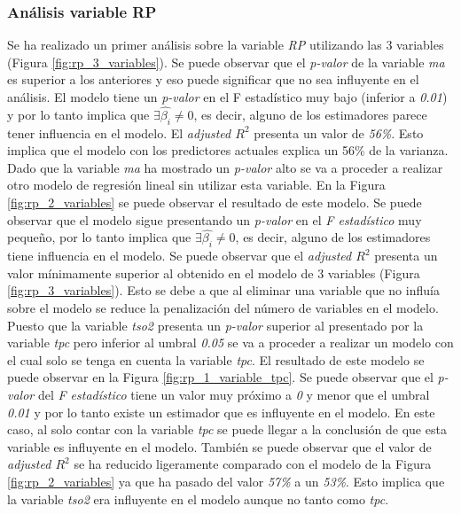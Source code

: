 \documentclass{article}
\begin{document}
\subsubsection{Análisis variable RP}

Se ha realizado un primer análisis sobre la variable \textit{RP} utilizando las 3 variables (Figura \ref{fig:rp_3_variables}). Se puede observar que el \textit{p-valor} de la variable \textit{ma} es superior a los anteriores y eso puede significar que no sea influyente en el análisis. El modelo tiene un \textit{p-valor} en el F estadístico muy bajo (inferior a \textit{0.01}) y por lo tanto implica que $\exists\hat{\beta_i}\neq0$, es decir, alguno de los estimadores parece tener influencia en el modelo. El \textit{adjusted $R^2$} presenta un valor de \textit{56\%}. Esto implica que el modelo con los predictores actuales explica un 56\% de la varianza.\\

Dado que la variable \textit{ma} ha mostrado un \textit{p-valor} alto se va a proceder a realizar otro modelo de regresión lineal sin utilizar esta variable. En la Figura \ref{fig:rp_2_variables} se puede observar el resultado de este modelo. Se puede observar que el modelo sigue presentando un \textit{p-valor} en el \textit{F estadístico} muy pequeño, por lo tanto implica que $\exists\hat{\beta_i}\neq0$, es decir, alguno de los estimadores tiene influencia en el modelo. Se puede observar que el \textit{adjusted $R^2$} presenta un valor mínimamente superior al obtenido en el modelo de 3 variables (Figura \ref{fig:rp_3_variables}). Esto se debe a que al eliminar una variable que no influía sobre el modelo se reduce la penalización del número de variables en el modelo.\\

Puesto que la variable \textit{tso2} presenta un \textit{p-valor} superior al presentado por la variable \textit{tpc} pero inferior al umbral \textit{0.05} se va a proceder a realizar un modelo con el cual solo se tenga en cuenta la variable \textit{tpc}. El resultado de este modelo se puede observar en la Figura \ref{fig:rp_1_variable_tpc}. Se puede observar que el \textit{p-valor} del \textit{F estadístico} tiene un valor muy próximo a \textit{0} y menor que el umbral \textit{0.01} y por lo tanto existe un estimador que es influyente en el modelo. En este caso, al solo contar con la variable \textit{tpc} se puede llegar a la conclusión de que esta variable es influyente en el modelo. También se puede observar que el valor de \textit{adjusted $R^2$} se ha reducido ligeramente comparado con el modelo de la Figura \ref{fig:rp_2_variables} ya que ha pasado del valor \textit{57\%} a un \textit{53\%}. Esto implica que la variable \textit{tso2} era influyente en el modelo aunque no tanto como \textit{tpc}.\\
\end{document}
